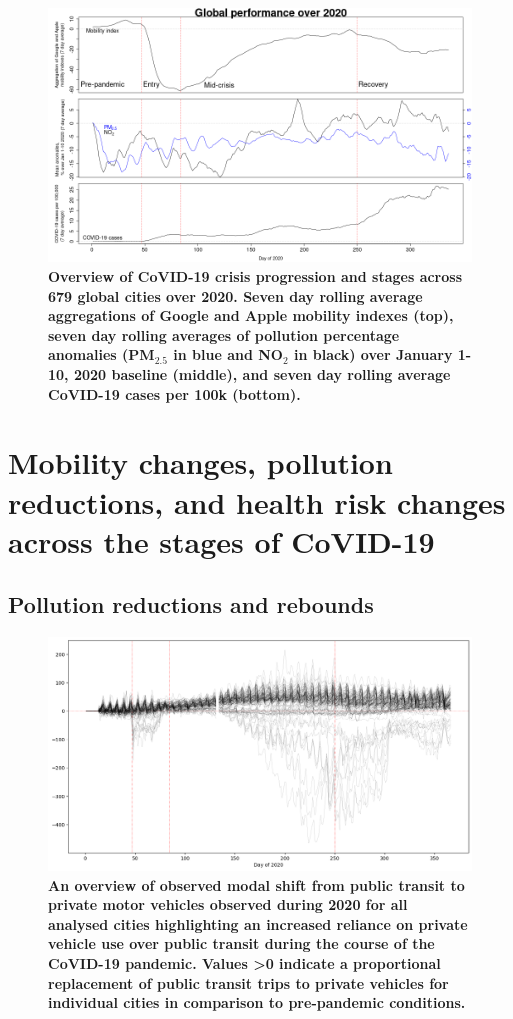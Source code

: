 \documentclass[preprint,10pt]{elsarticle} %
\begin{document}
\begin{figure}
\centering
\includegraphics[trim={0 0 15 20},clip,scale=0.45]{Images/LancetPHOverall.png}
\caption{\bf Overview of CoVID-19 crisis progression and stages across 679 global cities over 2020. Seven day rolling average aggregations of Google and Apple mobility indexes (top), seven day rolling averages of pollution percentage anomalies (PM$_{2.5}$ in blue and NO$_{2}$ in black) over January 1-10, 2020 baseline (middle), and seven day rolling average CoVID-19 cases per 100k (bottom).}
 \label{fig:stages}
\end{figure}

\section*{\textcolor{OliveGreen}{Mobility changes, pollution reductions, and health risk changes across the stages of CoVID-19}}
\subsection*{Pollution reductions and rebounds}

\begin{figure}
\centering
\includegraphics[trim={0 0 0 0},clip,scale=0.4]{Images/DrivingvsTransit.png}
\caption{\bf An overview of observed modal shift from public transit to private motor vehicles observed during 2020 for all analysed cities highlighting an increased reliance on private vehicle use over public transit during the course of the CoVID-19 pandemic. Values \textgreater 0 indicate a proportional replacement of public transit trips to private vehicles for individual cities in comparison to pre-pandemic conditions.}  
 \label{fig:driv_trans}
\end{figure}
\end{document}

